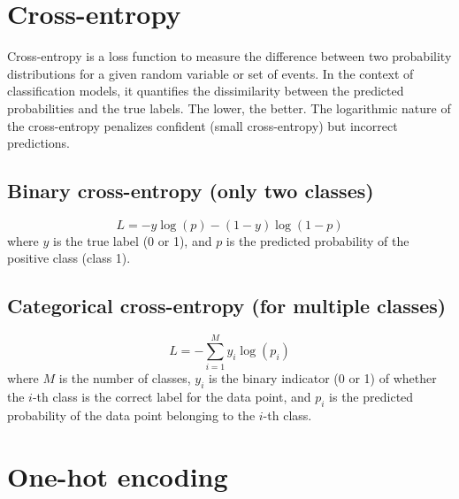 \section{Cross-entropy}
Cross-entropy is a loss function to measure the difference between two
probability distributions for a given random variable or set of
events. In the context of classification models, it quantifies the
dissimilarity between the predicted probabilities and the true
labels. The lower, the better. The logarithmic nature of the
cross-entropy penalizes confident (small cross-entropy) but incorrect
predictions.

\subsection{Binary cross-entropy (only two classes)}
\begin{equation}
  L = -y\log(p)-(1-y)\log(1-p)
\end{equation}
where $y$ is the true label (0 or 1), and $p$ is the predicted probability of the positive class (class 1).

\subsection{Categorical cross-entropy (for multiple classes)}
\begin{equation}
  L = -\sum_{i=1}^M y_i\log(p_i)
\end{equation}
where $M$ is the number of classes, $y_i$ is the binary indicator (0 or 1) of whether the $i$-th class is the correct label for the data point, and $p_i$ is the predicted probability of the data point belonging to the $i$-th class.

\section{One-hot encoding}


